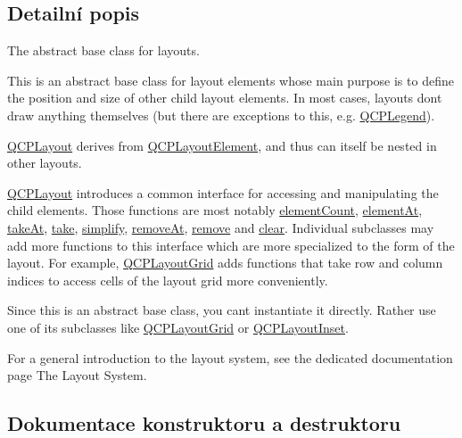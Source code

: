 \subsection{Detailní popis}
The abstract base class for layouts. 

This is an abstract base class for layout elements whose main purpose is to define the position and size of other child layout elements. In most cases, layouts don\textquotesingle{}t draw anything themselves (but there are exceptions to this, e.\+g. \hyperlink{classQCPLegend}{Q\+C\+P\+Legend}).

\hyperlink{classQCPLayout}{Q\+C\+P\+Layout} derives from \hyperlink{classQCPLayoutElement}{Q\+C\+P\+Layout\+Element}, and thus can itself be nested in other layouts.

\hyperlink{classQCPLayout}{Q\+C\+P\+Layout} introduces a common interface for accessing and manipulating the child elements. Those functions are most notably \hyperlink{classQCPLayout_ac2a4553f13cc91ed9eaf62d757752696}{element\+Count}, \hyperlink{classQCPLayout_a4115014e4c4ccbac2477405c994b2392}{element\+At}, \hyperlink{classQCPLayout_a5a79621fa0a6eabb8b520cfc04fb601a}{take\+At}, \hyperlink{classQCPLayout_ada26cd17e56472b0b4d7fbbc96873e4c}{take}, \hyperlink{classQCPLayout_a41e6ac049143866e8f8b4964efab01b2}{simplify}, \hyperlink{classQCPLayout_a2403f684fee3ce47132faaeed00bb066}{remove\+At}, \hyperlink{classQCPLayout_a6c58f537d8086f352576ab7c5b15d0bc}{remove} and \hyperlink{classQCPLayout_a02883bdf2769b5b227f0232dba1ac4ee}{clear}. Individual subclasses may add more functions to this interface which are more specialized to the form of the layout. For example, \hyperlink{classQCPLayoutGrid}{Q\+C\+P\+Layout\+Grid} adds functions that take row and column indices to access cells of the layout grid more conveniently.

Since this is an abstract base class, you can\textquotesingle{}t instantiate it directly. Rather use one of its subclasses like \hyperlink{classQCPLayoutGrid}{Q\+C\+P\+Layout\+Grid} or \hyperlink{classQCPLayoutInset}{Q\+C\+P\+Layout\+Inset}.

For a general introduction to the layout system, see the dedicated documentation page The Layout System. 

\subsection{Dokumentace konstruktoru a destruktoru}
\hypertarget{classQCPLayout_a04222e6e1361fd802d48f1a25b7020d4}{}
